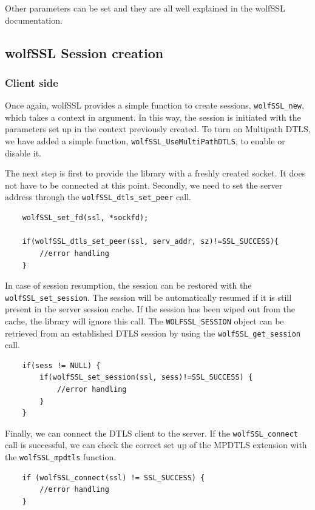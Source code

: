 Other parameters can be set and they are all well explained in the wolfSSL documentation\cite{wolfssl.doc}.

\subsection{wolfSSL Session creation}

\subsubsection{Client side}

Once again, wolfSSL provides a simple function to create sessions, \texttt{wolfSSL\_new}, which takes a context in argument. In this way, the session is initiated with the parameters set up in the context previously created. To turn on Multipath DTLS, we have added a simple function, \texttt{wolfSSL\_UseMultiPathDTLS}, to enable or disable it.

The next step is first to provide the library with a freshly created socket. It does not have to be connected at this point. Secondly, we need to set the server address through the \texttt{wolfSSL\_dtls\_set\_peer} call.

\begin{lstlisting}
    wolfSSL_set_fd(ssl, *sockfd);
    
    if(wolfSSL_dtls_set_peer(ssl, serv_addr, sz)!=SSL_SUCCESS){
        //error handling
    }
\end{lstlisting}

In case of session resumption, the session can be restored with the \texttt{wolfSSL\_set\_session}. The session will be automatically resumed if it is still present in the server session cache. If the session has been wiped out from the cache, the library will ignore this call. The \texttt{WOLFSSL\_SESSION} object can be retrieved from an established DTLS session by using the \texttt{wolfSSL\_get\_session} call.

\begin{lstlisting}
    if(sess != NULL) {
        if(wolfSSL_set_session(ssl, sess)!=SSL_SUCCESS) {
            //error handling
        }
    }
\end{lstlisting}

Finally, we can connect the DTLS client to the server. If the \texttt{wolfSSL\_connect} call is successful, we can check the correct set up of the MPDTLS extension with the \texttt{wolfSSL\_mpdtls} function.

\begin{lstlisting}
    if (wolfSSL_connect(ssl) != SSL_SUCCESS) {
        //error handling
    }
\end{lstlisting}


